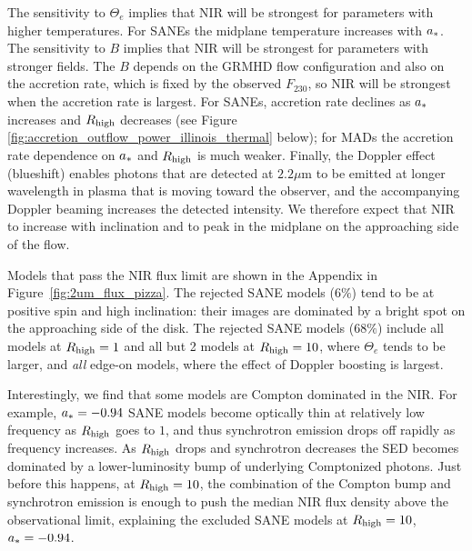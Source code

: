 The sensitivity to $\Theta_e$ implies that NIR will be strongest for parameters with higher temperatures.  For SANEs the midplane temperature increases with $a_*$.
The sensitivity to $B$ implies that NIR will be strongest for parameters with stronger fields.  The $B$ depends on the GRMHD flow configuration and also on the accretion rate, which is fixed by the observed $F_{230}$, so NIR will be strongest when the accretion rate is largest.  For SANEs, accretion rate declines as $a_*$ increases and $R_\mathrm{high}$ decreases (see Figure \ref{fig:accretion_outflow_power_illinois_thermal} below); for MADs the accretion rate dependence on $a_*$ and $R_\mathrm{high}$ is much weaker.
Finally, the Doppler effect (blueshift) enables photons that are detected at $2.2\mu$m to be emitted at longer wavelength in plasma that is moving toward the observer, and the accompanying Doppler beaming increases the detected intensity.  We therefore expect that NIR to increase with inclination and to peak in the midplane on the approaching side of the flow.

Models that pass the NIR flux limit are shown in the Appendix in Figure~\ref{fig:2um_flux_pizza}. The rejected SANE models ($6\%$) tend to be at positive spin and high inclination: their images are dominated by a bright spot on the approaching side of the disk.
The rejected SANE models ($68\%$) include all models at $R_\mathrm{high} = 1$ and all but 2 models at $R_\mathrm{high} = 10$, where $\Theta_e$ tends to be larger, and {\em all} edge-on models, where the effect of Doppler boosting is largest.

Interestingly, we find that some models are Compton dominated in the NIR.  For example, $a_* = -0.94$ SANE models become optically thin at relatively low frequency as $R_\mathrm{high}$ goes to $1$, and thus synchrotron emission drops off rapidly as frequency increases.
As $R_\mathrm{high}$ drops and synchrotron decreases the SED becomes dominated by a lower-luminosity bump of underlying Comptonized photons.  Just before this happens, at $R_\mathrm{high} = 10$, the combination of the Compton bump and synchrotron emission is enough to push the median NIR flux density above the observational limit, explaining the excluded SANE models at $R_\mathrm{high} = 10$, $a_* = -0.94$.


